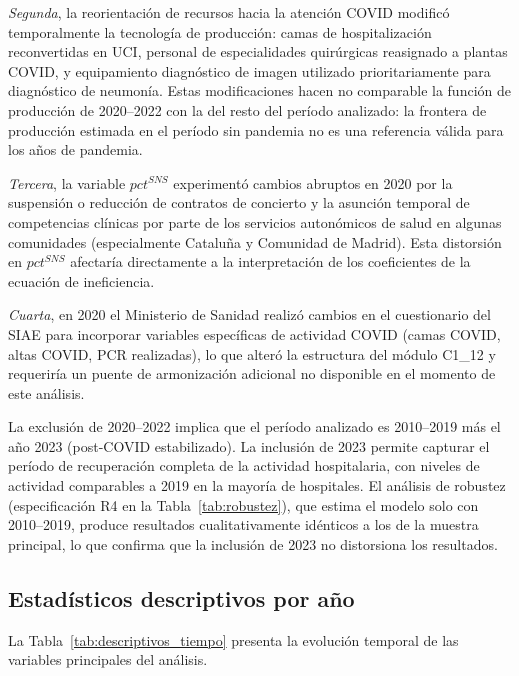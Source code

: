 \documentclass[12pt, a4paper, twoside, openright]{book}
\theoremstyle{plain}
\theoremstyle{definition}
\theoremstyle{remark}
\begin{document}
\textit{Segunda}, la reorientación de recursos hacia la atención COVID modificó temporalmente la tecnología de producción: camas de hospitalización reconvertidas en UCI, personal de especialidades quirúrgicas reasignado a plantas COVID, y equipamiento diagnóstico de imagen utilizado prioritariamente para diagnóstico de neumonía. Estas modificaciones hacen no comparable la función de producción de 2020--2022 con la del resto del período analizado: la frontera de producción estimada en el período sin pandemia no es una referencia válida para los años de pandemia.

\textit{Tercera}, la variable $pct^{SNS}$ experimentó cambios abruptos en 2020 por la suspensión o reducción de contratos de concierto y la asunción temporal de competencias clínicas por parte de los servicios autonómicos de salud en algunas comunidades (especialmente Cataluña y Comunidad de Madrid). Esta distorsión en $pct^{SNS}$ afectaría directamente a la interpretación de los coeficientes de la ecuación de ineficiencia.

\textit{Cuarta}, en 2020 el Ministerio de Sanidad realizó cambios en el cuestionario del SIAE para incorporar variables específicas de actividad COVID (camas COVID, altas COVID, PCR realizadas), lo que alteró la estructura del módulo C1\_12 y requeriría un puente de armonización adicional no disponible en el momento de este análisis.

La exclusión de 2020--2022 implica que el período analizado es 2010--2019 más el año 2023 (post-COVID estabilizado). La inclusión de 2023 permite capturar el período de recuperación completa de la actividad hospitalaria, con niveles de actividad comparables a 2019 en la mayoría de hospitales. El análisis de robustez (especificación R4 en la Tabla~\ref{tab:robustez}), que estima el modelo solo con 2010--2019, produce resultados cualitativamente idénticos a los de la muestra principal, lo que confirma que la inclusión de 2023 no distorsiona los resultados.

\subsection{Estadísticos descriptivos por año}

La Tabla~\ref{tab:descriptivos_tiempo} presenta la evolución temporal de las variables principales del análisis.
\end{document}
